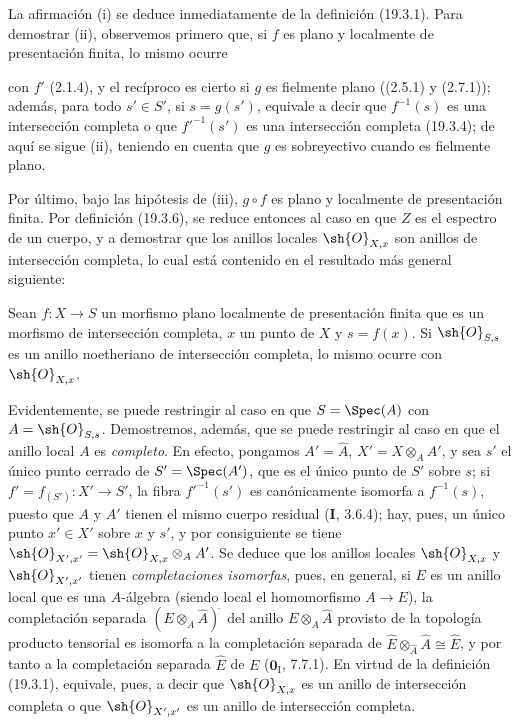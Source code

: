 La afirmación (i) se deduce inmediatamente de la definición (19.3.1). Para demostrar (ii), observemos primero que, si $f$ es plano y localmente de presentación finita, lo mismo ocurre


con $f'$ (2.1.4), y el recíproco es cierto si $g$ es fielmente plano ((2.5.1) y (2.7.1)); además, para todo $s'\in S'$, si $s=g(s')$, equivale a decir que $f^{-1}(s)$ es una intersección completa o que $f'^{-1}(s')$ es una intersección completa (19.3.4); de aquí se sigue (ii), teniendo en cuenta que $g$ es sobreyectivo cuando es fielmente plano.

Por último, bajo las hipótesis de (iii), $g\circ f$ es plano y localmente de presentación finita. Por definición (19.3.6), se reduce entonces al caso en que $Z$ es el espectro de un cuerpo, y a demostrar que los anillos locales $\sh{O}_{X,x}$ son anillos de intersección completa, lo cual está contenido en el resultado más general siguiente:

\begin{corollary}[19.3.10]
\label{IV.19.3.10}
Sean $f:X\to S$ un morfismo plano localmente de presentación finita que es un morfismo de intersección completa, $x$ un punto de $X$ y $s=f(x)$. Si $\sh{O}_{S,s}$ es un anillo noetheriano de intersección completa, lo mismo ocurre con $\sh{O}_{X,x}$.
\end{corollary}

Evidentemente, se puede restringir al caso en que $S=\Spec(A)$ con $A=\sh{O}_{S,s}$. Demostremos, además, que se puede restringir al caso en que el anillo local $A$ es \emph{completo}. En efecto, pongamos $A'=\widehat A$, $X'=X\otimes_A A'$, y sea $s'$ el único punto cerrado de $S'=\Spec(A')$, que es el único punto de $S'$ sobre $s$; si $f'=f_{(S')}:X'\to S'$, la fibra $f'^{-1}(s')$ es canónicamente isomorfa a $f^{-1}(s)$, puesto que $A$ y $A'$ tienen el mismo cuerpo residual (\textbf I, 3.6.4); hay, pues, un único punto $x'\in X'$ sobre $x$ y $s'$, y por consiguiente se tiene $\sh{O}_{X',x'}=\sh{O}_{X,x}\otimes_A A'$. Se deduce que los anillos locales $\sh{O}_{X,x}$ y $\sh{O}_{X',x'}$ tienen \emph{completaciones isomorfas}, pues, en general, si $E$ es un anillo local que es una $A$-álgebra (siendo local el homomorfismo $A\to E$), la completación separada $(E\otimes_A\widehat A)^{\widehat{\,}}$ del anillo $E\otimes_A\widehat A$ provisto de la topología producto tensorial es isomorfa a la completación separada de $\widehat E\otimes_{\widehat A}\widehat A\cong\widehat E$, y por tanto a la completación separada $\widehat E$ de $E$ ($\mathbf{0}_{\mathrm I}$, 7.7.1). En virtud de la definición (19.3.1), equivale, pues, a decir que $\sh{O}_{X,x}$ es un anillo de intersección completa o que $\sh{O}_{X',x'}$ es un anillo de intersección completa.


